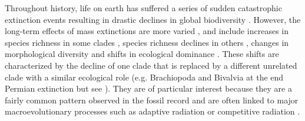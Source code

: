 \documentclass[12pt,letterpaper]{article}
\begin{document}
Throughout history, life on earth has suffered a series of sudden catastrophic extinction events resulting in drastic declines in global biodiversity \citep[e.g.][]{RaupPT,BentonPT,rennetime2013,Brusatte2015}. %
However, the long-term effects of mass extinctions are more varied \citep{Erwin1998344}, and include increases in species richness in some clades \citep{friedmanexplosive2010}, species richness declines in others \citep{Benton85}, changes in morphological diversity \cite{Ciampaglio2001,Ciampaglio200,kornextinction2013} and shifts in ecological dominance \citep[e.g.][]{Brusatte12092008,toljagictriassic-jurassic2013,bensonfaunal2014}.
These shifts are characterized by the decline of one clade that is replaced by a different unrelated clade with a similar ecological role \citep{Brusatte12092008} (e.g. Brachiopoda and Bivalvia at the end Permian extinction \citealt{Sepkiski1981,CLAPHAM01102006} but see \citealt{Payne22052014}). They are of particular interest because they are a fairly common pattern observed in the fossil record \citep[e.g.][]{D'Hondt01011996,Coxall01042006,thorneresetting2011,bensonfaunal2014} and are often linked to major macroevolutionary processes such as adaptive radiation \citep{Losos2010} or competitive radiation \citep{Brusatte12092008}.
\end{document}
